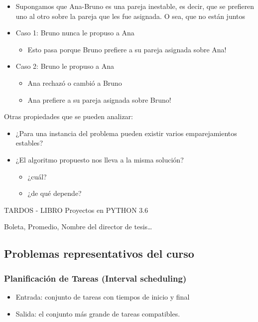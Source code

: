\documentclass[letterpaper]{article}
\begin{document}
\begin{itemize}
\begin{itemize}
\begin{itemize}
\item Supongamos que Ana-Bruno es una pareja inestable, es decir, que se
prefieren uno al otro sobre la pareja que les fue asignada. O sea, que no
están juntos
\item Caso 1: Bruno nunca le propuso a Ana
\begin{itemize}
\item Esto pasa porque Bruno prefiere a su pareja asignada sobre Ana!
\end{itemize}
\item Caso 2: Bruno le propuso a Ana
\begin{itemize}
\item Ana rechazó o cambió a Bruno
\item Ana prefiere a su pareja asignada sobre Bruno!
\end{itemize}
\end{itemize}
\end{itemize}
\end{itemize}

Otras propiedades que se pueden analizar:
\begin{itemize}
\item ¿Para una instancia del problema pueden existir varios emparejamientos
estables?
\item ¿El algoritmo propuesto nos lleva a la misma solución?
\begin{itemize}
\item ¿cuál?
\item ¿de qué depende?
\end{itemize}
\end{itemize}

TARDOS - LIBRO
Proyectos en PYTHON 3.6

Boleta, Promedio, Nombre del director de tesis\ldots{}
\subsection{Problemas representativos del curso}
\label{sec:orge1d2a2d}
\subsubsection{Planificación de Tareas (Interval scheduling)}
\label{sec:orge7bdb0d}
\begin{itemize}
\item Entrada: conjunto de tareas con tiempos de inicio y final
\item Salida: el conjunto más grande de tareas compatibles.
\end{itemize}
\end{document}
